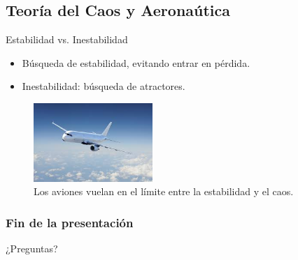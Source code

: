 \documentclass[8pt]{beamer}
\begin{document}
\subsection{Teoría del Caos y Aeronaútica}
\begin{frame}
\begin{block}{Estabilidad vs. Inestabilidad }
\begin{itemize}
\item Búsqueda de estabilidad, evitando entrar en pérdida.
\item Inestabilidad: búsqueda de atractores.
\end{itemize}
\end{block}
\begin{figure}[hbtp]
\centering
\includegraphics[width = 0.4\textwidth]{img/aero.jpeg}
\caption{Los aviones vuelan en el límite entre la estabilidad y el caos.}
\label{fig:aviones}
\end{figure}
\end{frame}



\begin{frame}
\frametitle{Fin de la presentación}
\Huge{\centerline{¿Preguntas?}}
\end{frame}

\end{document}

